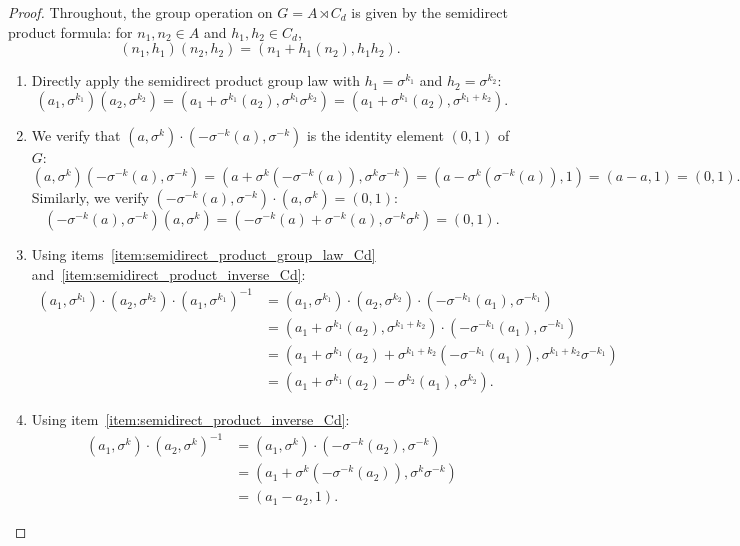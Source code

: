 \begin{proof}
    Throughout, the group operation on $G = A \rtimes C_d$ is given by the semidirect product formula: for $n_1, n_2 \in A$ and $h_1, h_2 \in C_d$,
    $$ (n_1, h_1)(n_2, h_2) = (n_1 + h_1(n_2), h_1 h_2). $$

    \begin{enumerate}
        \item Directly apply the semidirect product group law with $h_1 = \sigma^{k_1}$ and $h_2 = \sigma^{k_2}$:
            $$ (a_1, \sigma^{k_1})(a_2, \sigma^{k_2}) = (a_1 + \sigma^{k_1}(a_2), \sigma^{k_1} \sigma^{k_2}) = (a_1 + \sigma^{k_1}(a_2), \sigma^{k_1+k_2}). $$

        \item We verify that $(a, \sigma^k) \cdot (-\sigma^{-k}(a), \sigma^{-k})$ is the identity element $(0, 1)$ of $G$:
            $$ (a, \sigma^k)(-\sigma^{-k}(a), \sigma^{-k}) = (a + \sigma^k(-\sigma^{-k}(a)), \sigma^k \sigma^{-k}) = (a - \sigma^k(\sigma^{-k}(a)), 1) = (a - a, 1) = (0, 1). $$
            Similarly, we verify $(-\sigma^{-k}(a), \sigma^{-k}) \cdot (a, \sigma^k) = (0, 1)$:
            $$ (-\sigma^{-k}(a), \sigma^{-k})(a, \sigma^k) = (-\sigma^{-k}(a) + \sigma^{-k}(a), \sigma^{-k} \sigma^k) = (0, 1). $$

        \item Using items~\ref{item:semidirect_product_group_law_Cd} and~\ref{item:semidirect_product_inverse_Cd}:
            \begin{align*}
                (a_1, \sigma^{k_1}) \cdot (a_2, \sigma^{k_2}) \cdot (a_1, \sigma^{k_1})^{-1}
                &= (a_1, \sigma^{k_1}) \cdot (a_2, \sigma^{k_2}) \cdot (-\sigma^{-k_1}(a_1), \sigma^{-k_1}) \\
                &= (a_1 + \sigma^{k_1}(a_2), \sigma^{k_1+k_2}) \cdot (-\sigma^{-k_1}(a_1), \sigma^{-k_1}) \\
                &= (a_1 + \sigma^{k_1}(a_2) + \sigma^{k_1+k_2}(-\sigma^{-k_1}(a_1)), \sigma^{k_1+k_2} \sigma^{-k_1}) \\
                &= (a_1 + \sigma^{k_1}(a_2) - \sigma^{k_2}(a_1), \sigma^{k_2}).
            \end{align*}

        \item Using item~\ref{item:semidirect_product_inverse_Cd}:
            \begin{align*}
                (a_1, \sigma^k) \cdot (a_2, \sigma^k)^{-1}
                &= (a_1, \sigma^k) \cdot (-\sigma^{-k}(a_2), \sigma^{-k}) \\
                &= (a_1 + \sigma^k(-\sigma^{-k}(a_2)), \sigma^k \sigma^{-k}) \\
                &= (a_1 - a_2, 1).
            \end{align*}


\end{enumerate}
\end{proof}

